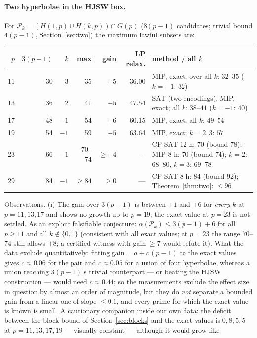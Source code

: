 \documentclass[11pt]{article}
\theoremstyle{remark}
\newcommand{\Gp}{G(p)}
\newcommand{\Pset}{\mathcal{P}}
\begin{document}
\paragraph{Two hyperbolae in the HJSW box.}  For $\Pset_k=(H(1,p)\cup H(k,p))\cap\Gp$ ($8(p-1)$ candidates; trivial bound $4(p-1)$,
Section~\ref{sec:two}) the maximum lawful subsets are:
\begin{center}\footnotesize
\begin{tabular}{rrrrrrp{6.6cm}}
\toprule
$p$ & $3(p-1)$ & $k$ & max & gain & LP relax. & method / all $k$\\
\midrule
11 & 30 & 3 & 35 & $+5$ & 36.00 & MIP, exact; over all $k$: $32$--$35$ ($k=-1$: $32$)\\
13 & 36 & 2 & 41 & $+5$ & 47.54 & SAT (two encodings), MIP, exact; all $k$: $38$--$41$ ($k=-1$: $40$)\\
17 & 48 & $-1$ & 54 & $+6$ & 60.15 & MIP, exact; all $k$: $49$--$54$\\
19 & 54 & $-1$ & 59 & $+5$ & 63.64 & MIP, exact; $k=2,3$: $57$\\
23 & 66 & $-1$ & $70$--$74$ & $\ge+4$ & --- & CP-SAT 12 h: 70 (bound 78); MIP 8 h: 70 (bound 74); $k=2$: $68$--$80$, $k=3$: $69$--$78$\\
29 & 84 & $-1$ & $\ge84$ & $\ge0$ & --- & CP-SAT 8 h: 84 (bound 92); Theorem~\ref{thm:two}: $\le96$\\
\bottomrule
\end{tabular}
\end{center}
Observations.  (i) The gain over $3(p-1)$ is between $+1$ and $+6$ for \emph{every} $k$ at $p=11,13,17$ and shows no growth up to
$p=19$; the exact value at $p=23$ is not settled.  As an explicit falsifiable conjecture: $\alpha(\Pset_k)\le3(p-1)+6$ for all $p\ge11$
and all $k\notin\{0,1\}$ (consistent with all exact values; at $p=23$ the range $70$--$74$ still allows $+8$; a certified witness with
gain $\ge7$ would refute it).  What the data exclude quantitatively: fitting $\text{gain}=a+c\,(p-1)$ to the exact values gives
$c\approx0.06$ for the pair and $c\approx0.05$ for a union of four hyperbolae, whereas a union reaching $3(p-1)$'s trivial
counterpart --- or beating the HJSW construction --- would need $c\approx0.44$; so the measurements exclude the effect size in question by
almost an order of magnitude, but they do \emph{not} separate a bounded gain from a linear one of slope $\le0.1$, and every prime for which
the exact value is known is small.  A cautionary companion inside our own data: the deficit between the block bound of
Section~\ref{sec:blocks} and the exact values is $0,8,5,5$ at $p=11,13,17,19$ --- visually constant --- although it would grow like
\end{document}
